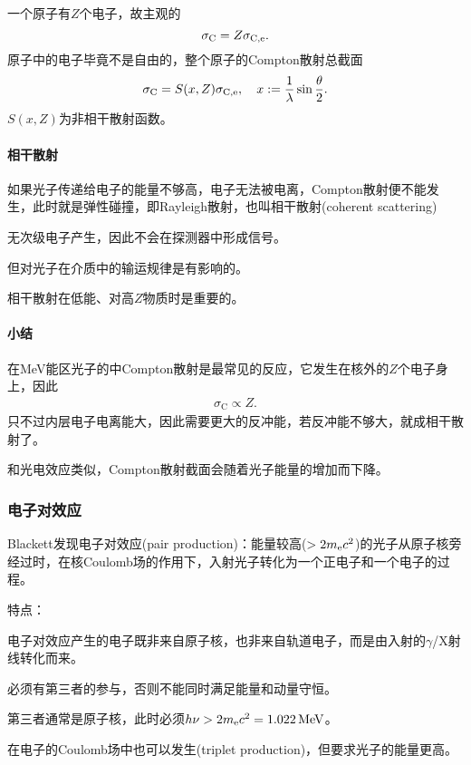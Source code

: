 一个原子有$Z$个电子，故主观的
\[
	\sigma_\mathrm C=Z\sigma_{\mathrm C,\mathrm e}.
\]
原子中的电子毕竟不是自由的，整个原子的Compton散射总截面
\begin{align}
	\sigma_\mathrm C=S(x,Z)\sigma_{\mathrm C,\mathrm e},\quad x:=\frac1\lambda\sin\frac\theta{2}.
\end{align}
$S(x,Z)$为非相干散射函数。
\paragraph{相干散射}
如果光子传递给电子的能量不够高，电子无法被电离，Compton散射便不能发生，此时就是弹性碰撞，即Rayleigh散射，也叫相干散射(coherent scattering)
\begin{compactenum}
	\item 无次级电子产生，因此不会在探测器中形成信号。
	\item 但对光子在介质中的输运规律是有影响的。
	\item 相干散射在低能、对高$Z$物质时是重要的。
\end{compactenum}
\paragraph{小结}在MeV能区光子的中Compton散射是最常见的反应，它发生在核外的$Z$个电子身上，因此
\begin{align}
	\sigma_\mathrm C\propto Z.
\end{align}
只不过内层电子电离能大，因此需要更大的反冲能，若反冲能不够大，就成相干散射了。

和光电效应类似，Compton散射截面会随着光子能量的增加而下降。
\subsubsection{电子对效应}
Blackett发现电子对效应(pair production)：能量较高($>2m_\mathrm e c^2$)的光子从原子核旁经过时，在核Coulomb场的作用下，入射光子转化为一个正电子和一个电子的过程。

特点：
\begin{compactenum}
	\item 电子对效应产生的电子既非来自原子核，也非来自轨道电子，而是由入射的$\gamma$/X射线转化而来。
	\item 必须有第三者的参与，否则不能同时满足能量和动量守恒。
	\item 第三者通常是原子核，此时必须$h\nu>2m_\mathrm e c^2=\SI{1.022}{MeV}$。
	\item 在电子的Coulomb场中也可以发生(triplet production)，但要求光子的能量更高。
\end{compactenum}

